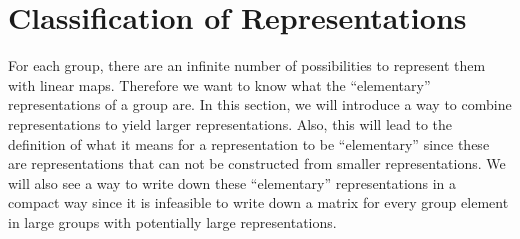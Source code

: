 \section{Classification of Representations}

For each group, there are an infinite number of possibilities to represent them with linear maps.
Therefore we want to know what the ``elementary'' representations of a group are.
In this section, we will introduce a way to combine representations to yield larger representations.
Also, this will lead to the definition of what it means for a representation to be ``elementary'' since these are representations that can not be constructed from smaller representations.
We will also see a way to write down these ``elementary'' representations in a compact way since it is infeasible to write down a matrix for every group element in large groups with potentially large representations.




